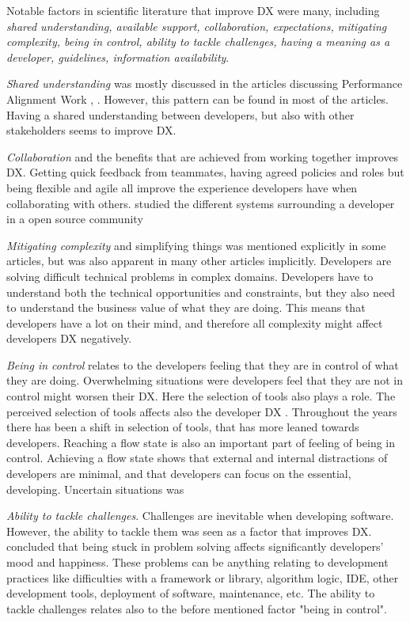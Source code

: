 \documentclass[english, 12pt, a4paper, sci, utf8, a-1b, online]{aaltothesis}
\newcounter{subsubsubsection}[subsubsection]
\begin{document}

Notable factors in scientific literature that improve DX were many, including \textit{shared understanding,	available support, collaboration, expectations, mitigating complexity, being in control, ability to tackle challenges, having a meaning as a developer, guidelines, information availability}.

\textit{Shared understanding} was mostly discussed in the articles discussing Performance Alignment Work \parencite{paw}, \parencite{how-developers-experience-team-performance}. However, this pattern can be found in most of the articles. Having a shared understanding between developers, but also with other stakeholders seems to improve DX.

\textit{Collaboration} and the benefits that are achieved from working together improves DX. Getting quick feedback from teammates, having agreed policies and roles but being flexible and agile all improve the experience developers have when collaborating with others. \textcite{entering-an-ecosystem} studied the different systems surrounding a developer in a open source community

\textit{Mitigating complexity} and simplifying things was mentioned explicitly in some articles, but was also apparent in many other articles implicitly. Developers are solving difficult technical problems in complex domains. Developers have to understand both the technical opportunities and constraints, but they also need to understand the business value of what they are doing. This means that developers have a lot on their mind, and therefore all complexity might affect developers DX negatively.

\textit{Being in control} relates to the developers feeling that they are in control of what they are doing. Overwhelming situations were developers feel that they are not in control might worsen their DX. Here the selection of tools also plays a role. The perceived selection of tools affects also the developer DX \parencite{software-developers-as-users}. Throughout the years there has been a shift in selection of tools, that has more leaned towards developers. Reaching a flow state is also an important part of feeling of being in control. Achieving a flow state shows that external and internal distractions of developers are minimal, and that developers can focus on the essential, developing. Uncertain situations was

\textit{Ability to tackle challenges}. Challenges are inevitable when developing software. However, the ability to tackle them was seen as a factor that improves DX. \textcite{what-happens-when-unhappy} concluded that being stuck in problem solving affects significantly developers' mood and happiness. These problems can be anything relating to development practices like difficulties with a framework or library, algorithm logic, IDE, other development tools, deployment of software, maintenance, etc. The ability to tackle challenges relates also to the before mentioned factor "being in control".
\end{document}
